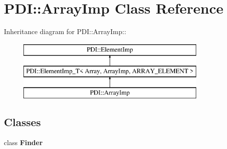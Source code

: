 \hypertarget{class_p_d_i_1_1_array_imp}{
\section{PDI::ArrayImp Class Reference}
\label{class_p_d_i_1_1_array_imp}
}
Inheritance diagram for PDI::ArrayImp::\begin{figure}[H]
\begin{center}
\leavevmode
\includegraphics[height=3cm]{class_p_d_i_1_1_array_imp}
\end{center}
\end{figure}
\subsection*{Classes}
\begin{CompactItemize}
\item 
class \textbf{Finder}
\end{CompactItemize}
